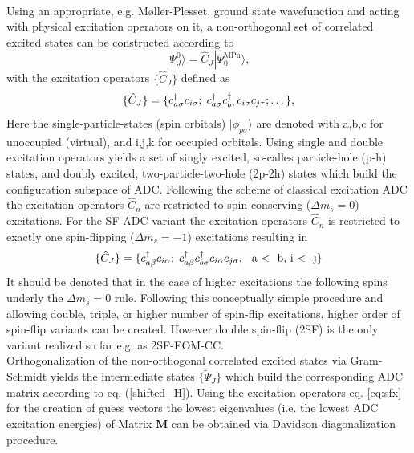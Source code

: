 \documentclass[aip,graphicx,amsmath,reprint]{revtex4-1}
\begin{document}
\\
Using an appropriate, e.g. M\o ller-Plesset,  ground state wavefunction and acting with physical excitation operators on it, a non-orthogonal set of correlated excited states can be constructed according to 
\begin{equation}
|\Psi^0_J\rangle=\hat{C}_J|\Psi^{{\text{MPn}}}_0\rangle,
\label{eq:isr2}
\end{equation}
with the excitation operators $\{\hat{C}_J\}$ defined as 
\begin{equation}
\{\hat{C}_J\} = \{c_{a\sigma}^\dagger c_{i\sigma}; \hspace{0.1cm}c_{a\sigma}^\dagger c_{b\tau}^\dagger c_{i\sigma} c_{j\tau}; \dots \},
\label{exop}
\end{equation}
Here the single-particle-states (spin orbitals)  $|\phi_{p\sigma}\rangle$ are denoted with a,b,c for unoccupied (virtual), and i,j,k for occupied orbitals. Using single and double excitation operators yields a set of singly excited, so-calles particle-hole (p-h) states, and doubly excited, two-particle-two-hole (2p-2h) states which build the configuration subspace of ADC. Following the scheme of classical excitation ADC the excitation operators ${\hat{C}_n}$ are restricted to spin conserving ($\Delta m_s=0$) excitations. For the SF-ADC variant the excitation operators ${\hat{C}_n}$ is restricted to exactly one spin-flipping ($\Delta m_s=-1$) excitations resulting in
\begin{equation}
\{\hat{C}_J\} = \{c_{a\beta}^\dagger c_{i\alpha}; \hspace{0.1cm}c_{a\beta}^\dagger c_{b\sigma}^\dagger c_{i\alpha} c_{j\sigma}, \hspace{0.25cm} \text{a \textless~ b, i \textless~ j}\}
\label{eq:sfx}
\end{equation}
It should be denoted that in the case of higher excitations the following spins underly the $\Delta m_s=0$ rule. Following this conceptually simple procedure and allowing double, triple, or higher number of spin-flip excitations, higher order of spin-flip variants can be created. However double spin-flip (2SF) is the only variant realized so far e.g. as 2SF-EOM-CC.\cite{Krylov2009} 
\\
Orthogonalization of the non-orthogonal correlated excited states via Gram-Schmidt yields the intermediate states $\{\tilde{\Psi}_J\}$ which build the corresponding ADC matrix according to eq. (\ref{shifted_H}). Using the excitation operators eq. \eqref{eq:sfx} for the creation of guess vectors the lowest eigenvalues (i.e. the lowest ADC excitation energies) of Matrix {\bf{M}} can be obtained via Davidson diagonalization procedure. \cite{Davidson1989} \\
\end{document}
